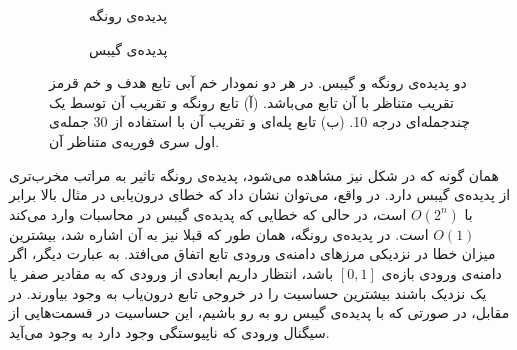 \documentclass[12pt,onecolumn,a4paper]{article}
\begin{document}
 \begin{figure}
    \centering
    \begin{subfigure}[b]{0.45\textwidth}
        \centering
        \caption{پدیده‌ی رونگه}
        \label{fig:runge}
    \end{subfigure}
    \hfill
    \begin{subfigure}[b]{0.45\textwidth}
        \centering
        \caption{پدیده‌ی گیبس}
        \label{fig:gibbs}
    \end{subfigure}
       \caption{دو پدیده‌ی رونگه و گیبس. در هر دو نمودار خم آبی تابع هدف و خم قرمز تقریب متناظر با آن تابع می‌باشد. (آ) تابع رونگه و تقریب آن توسط یک چندجمله‌ای درجه 10. (ب) تابع پله‌ای و تقریب آن با استفاده از 30 جمله‌ی اول سری فوریه‌ی متناظر آن.}
       \label{fig:runge_gibbs}
\end{figure}

همان گونه که در شکل نیز مشاهده می‌شود، پدیده‌ی رونگه تاثیر به مراتب مخرب‌تری از پدیده‌ی گیبس دارد. در واقع، می‌توان نشان داد که خطای درون‌یابی  در مثال بالا برابر با 
$O(2^n‌)$ 
است، در حالی که خطایی که پدیده‌ی گیبس در محاسبات وارد می‌کند 
$O(1)$ 
است. در پدیده‌ی رونگه، همان طور که قبلا نیز به آن اشاره شد، بیشترین میزان خطا در نزدیکی مرزهای دامنه‌ی ورودی تابع اتفاق می‌افتد. به عبارت دیگر، اگر دامنه‌ی ورودی بازه‌ی 
$[0,1]$ 
باشد، انتظار داریم ابعادی از ورودی که به مقادیر صفر یا یک نزدیک باشند بیشترین حساسیت را در خروجی تابع درون‌یاب به وجود بیاورند. در مقابل، در صورتی که با پدیده‌ی گیبس رو به رو باشیم، این حساسیت در قسمت‌هایی از سیگنال ورودی که ناپیوستگی وجود دارد به وجود می‌آید.
\end{document}
